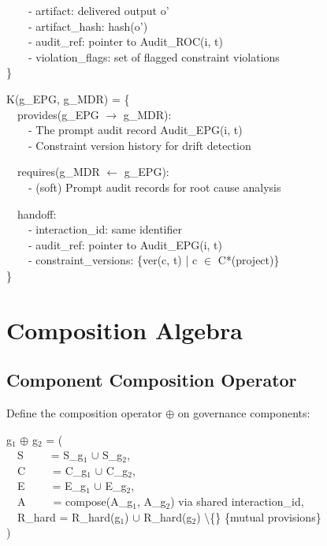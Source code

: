 \begin{claddisp}
~~~~- artifact: delivered output o'\\
~~~~- artifact\_hash: hash(o')\\
~~~~- audit\_ref: pointer to Audit\_ROC(i, t)\\
~~~~- violation\_flags: set of flagged constraint violations\\
\}
\par\smallskip
K(g\_EPG, g\_MDR) = \{\\
~~provides(g\_EPG $\to$ g\_MDR):\\
~~~~- The prompt audit record Audit\_EPG(i, t)\\
~~~~- Constraint version history for drift detection
\par\smallskip
~~requires(g\_MDR $\leftarrow$ g\_EPG):\\
~~~~- (soft) Prompt audit records for root cause analysis
\par\smallskip
~~handoff:\\
~~~~- interaction\_id: same identifier\\
~~~~- audit\_ref: pointer to Audit\_EPG(i, t)\\
~~~~- constraint\_versions: \{ver(c, t) | c $\in$ C*(project)\}\\
\}
\end{claddisp}


\section{Composition Algebra}
\label{sec:framework-12}


\subsection{Component Composition Operator}


\begin{cdef}[(Composition)]
Define the composition operator $\oplus$ on governance components:

\begin{cladnote}
g$_1$ $\oplus$ g$_2$ = (\\
~~S~~~~~= S\_g$_1$ $\cup$ S\_g$_2$,\\
~~C~~~~~= C\_g$_1$ $\cup$ C\_g$_2$,\\
~~E~~~~~= E\_g$_1$ $\cup$ E\_g$_2$,\\
~~A~~~~~= compose(A\_g$_1$, A\_g$_2$) via shared interaction\_id,\\
~~R\_hard = R\_hard(g$_1$) $\cup$ R\_hard(g$_2$) \textbackslash\{\} \{mutual provisions\}\\
)\\
\end{cladnote}
\end{cdef}



